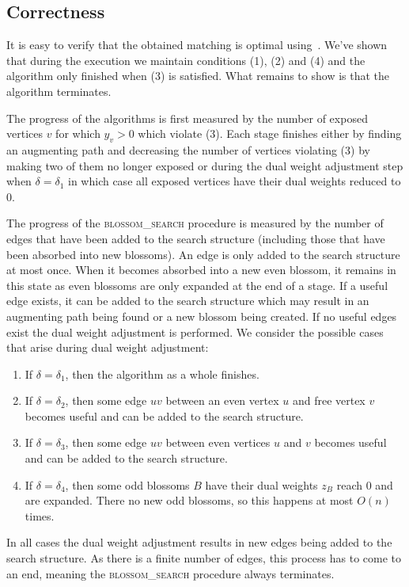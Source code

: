 \subsection{Correctness}

It is easy to verify that the obtained matching is optimal using~. We've shown that during the execution we maintain conditions (1), (2) and (4) and the algorithm only finished when (3) is satisfied. What remains to show is that the algorithm terminates.

The progress of the algorithms is first measured by the number of exposed vertices $v$ for which $y_v > 0$ which violate (3). Each stage finishes either by finding an augmenting path and decreasing the number of vertices violating (3) by making two of them no longer exposed or during the dual weight adjustment step when $\delta = \delta_1$ in which case all exposed vertices have their dual weights reduced to $0$.

The progress of the \textsc{blossom\_search} procedure is measured by the number of edges that have been added to the search structure (including those that have been absorbed into new blossoms). An edge is only added to the search structure at most once. When it becomes absorbed into a new even blossom, it remains in this state as even blossoms are only expanded at the end of a stage. If a useful edge exists, it can be added to the search structure which may result in an augmenting path being found or a new blossom being created. If no useful edges exist the dual weight adjustment is performed. We consider the possible cases that arise during dual weight adjustment:

\begin{enumerate}
    \item If $\delta = \delta_1$, then the algorithm as a whole finishes.
    \item If $\delta = \delta_2$, then some edge $uv$ between an even vertex $u$ and free vertex $v$ becomes useful and can be added to the search structure.
    \item If $\delta = \delta_3$, then some edge $uv$ between even vertices $u$ and $v$ becomes useful and can be added to the search structure.
    \item If $\delta = \delta_4$, then some odd blossoms $B$ have their dual weights $z_B$ reach $0$ and are expanded. There no new odd blossoms, so this happens at most $O(n)$ times.
\end{enumerate}

In all cases the dual weight adjustment results in new edges being added to the search structure. As there is a finite number of edges, this process has to come to an end, meaning the \textsc{blossom\_search} procedure always terminates.


